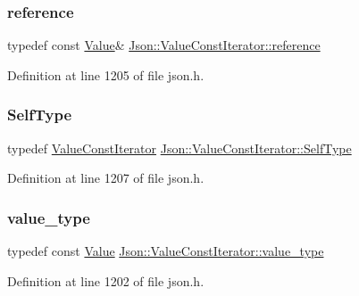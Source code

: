 \subsubsection{\texorpdfstring{reference}{reference}}
{\footnotesize\ttfamily typedef const \hyperlink{class_json_1_1_value}{Value}\& \hyperlink{class_json_1_1_value_const_iterator_aa9b05c6a37cd352ea1ee6e13b816f709}{Json\+::\+Value\+Const\+Iterator\+::reference}}



Definition at line 1205 of file json.\+h.

\mbox{\label{class_json_1_1_value_const_iterator_a0c2e33e7eb5a80dd8709fb28ece83933}} 
\subsubsection{\texorpdfstring{Self\+Type}{SelfType}}
{\footnotesize\ttfamily typedef \hyperlink{class_json_1_1_value_const_iterator}{Value\+Const\+Iterator} \hyperlink{class_json_1_1_value_const_iterator_a0c2e33e7eb5a80dd8709fb28ece83933}{Json\+::\+Value\+Const\+Iterator\+::\+Self\+Type}}



Definition at line 1207 of file json.\+h.

\mbox{\label{class_json_1_1_value_const_iterator_aa5f1707dcef4bfe73e23ddc14dbe760d}} 
\subsubsection{\texorpdfstring{value\+\_\+type}{value\_type}}
{\footnotesize\ttfamily typedef const \hyperlink{class_json_1_1_value}{Value} \hyperlink{class_json_1_1_value_const_iterator_aa5f1707dcef4bfe73e23ddc14dbe760d}{Json\+::\+Value\+Const\+Iterator\+::value\+\_\+type}}



Definition at line 1202 of file json.\+h.



